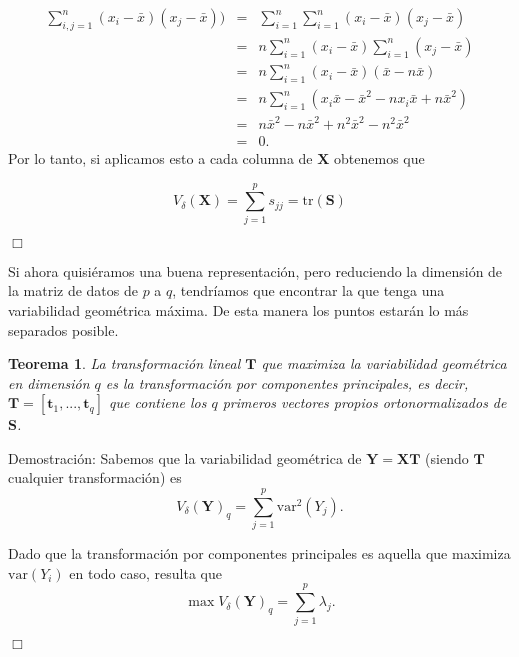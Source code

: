 \documentclass[tfg,cienciasbased,lot,lof,covers,final,overleaf,nocopyright]{tfgtfmthesisuam}
\newtheorem{teor}{Teorema}[chapter]
\begin{document}
\begin{eqnarray*}
    \sum_{i,j=1}^{n}(x_i-\bar{x})(x_j-\bar{x})) & = &  \sum_{i=1}^{n}\sum_{i=1}^{n}(x_i-\bar{x})(x_j-\bar{x})\\
    & = & n\sum_{i=1}^{n}(x_i-\bar{x})\sum_{i=1}^{n}(x_j-\bar{x})\\
    & = & n\sum_{i=1}^{n}(x_i-\bar{x})(\bar{x}-n\bar{x})\\
    & = & n\sum_{i=1}^{n}(x_i\bar{x}-\bar{x}^2-nx_i\bar{x}+n\bar{x}^2)\\
    & = & n\bar{x}^2-n\bar{x}^2+n^2\bar{x}^2-n^2\bar{x}^2\\
    & = & 0.
\end{eqnarray*}
Por lo tanto, si aplicamos esto a cada columna de $\mathbf{X}$ obtenemos que

\begin{equation*}
    V_{\delta}(\mathbf{X}) = \sum_{j=1}^p s_{jj} = \mbox{tr}(\mathbf{S})
\end{equation*}
\begin{flushright}$\Box$\end{flushright}



Si ahora quisiéramos una buena representación, pero reduciendo la dimensión de la matriz de datos de $p$ a $q$, tendríamos que encontrar la que tenga una variabilidad geométrica máxima. De esta manera los puntos estarán lo más separados posible.

\begin{teor}
    La transformación lineal $\mathbf{T}$ que maximiza la variabilidad geométrica en dimensión $q$ es la transformación por componentes principales, es decir, $\mathbf{T} = [\mathbf{t}_1, ..., \mathbf{t}_q]$ que contiene los $q$ primeros vectores propios ortonormalizados de $\mathbf{S}$.
\end{teor}

Demostración:
Sabemos que la variabilidad geométrica de $\mathbf{Y} = \mathbf{XT}$ (siendo $\mathbf{T}$ cualquier transformación) es
\begin{equation*}
    V_{\delta}(\mathbf{Y})_q = \sum_{j=1}^p \mbox{var}^2(Y_j).
\end{equation*}

Dado que la transformación por componentes principales es aquella que maximiza $\mbox{var}(Y_i)$ en todo caso, resulta que
\begin{equation*}
    \max V_{\delta}(\mathbf{Y})_q = \sum_{j=1}^p \lambda_j.
\end{equation*}
\begin{flushright}$\Box$\end{flushright}
\end{document}

